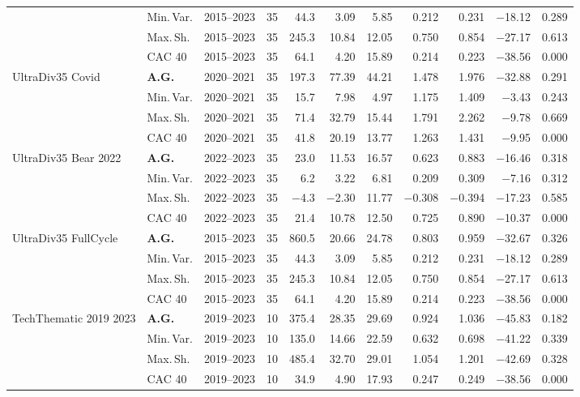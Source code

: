 \begin{longtable}{p{2.6cm} l c c r r r r r r r}
 & Min.\,Var. & 2015--2023 & 35 & 44.3 & 3.09 & 5.85 & 0.212 & 0.231 & $-$18.12 & 0.289 \\
 & Max.\,Sh. & 2015--2023 & 35 & 245.3 & 10.84 & 12.05 & 0.750 & 0.854 & $-$27.17 & 0.613 \\
 & CAC 40 & 2015--2023 & 35 & 64.1 & 4.20 & 15.89 & 0.214 & 0.223 & $-$38.56 & 0.000 \\
\midrule
UltraDiv35 Covid & \textbf{A.G.} & 2020--2021 & 35 & 197.3 & 77.39 & 44.21 & 1.478 & 1.976 & $-$32.88 & 0.291 \\
 & Min.\,Var. & 2020--2021 & 35 & 15.7 & 7.98 & 4.97 & 1.175 & 1.409 & $-$3.43 & 0.243 \\
 & Max.\,Sh. & 2020--2021 & 35 & 71.4 & 32.79 & 15.44 & 1.791 & 2.262 & $-$9.78 & 0.669 \\
 & CAC 40 & 2020--2021 & 35 & 41.8 & 20.19 & 13.77 & 1.263 & 1.431 & $-$9.95 & 0.000 \\
\midrule
UltraDiv35 Bear 2022 & \textbf{A.G.} & 2022--2023 & 35 & 23.0 & 11.53 & 16.57 & 0.623 & 0.883 & $-$16.46 & 0.318 \\
 & Min.\,Var. & 2022--2023 & 35 & 6.2 & 3.22 & 6.81 & 0.209 & 0.309 & $-$7.16 & 0.312 \\
 & Max.\,Sh. & 2022--2023 & 35 & $-$4.3 & $-$2.30 & 11.77 & $-$0.308 & $-$0.394 & $-$17.23 & 0.585 \\
 & CAC 40 & 2022--2023 & 35 & 21.4 & 10.78 & 12.50 & 0.725 & 0.890 & $-$10.37 & 0.000 \\
\midrule
UltraDiv35 FullCycle & \textbf{A.G.} & 2015--2023 & 35 & 860.5 & 20.66 & 24.78 & 0.803 & 0.959 & $-$32.67 & 0.326 \\
 & Min.\,Var. & 2015--2023 & 35 & 44.3 & 3.09 & 5.85 & 0.212 & 0.231 & $-$18.12 & 0.289 \\
 & Max.\,Sh. & 2015--2023 & 35 & 245.3 & 10.84 & 12.05 & 0.750 & 0.854 & $-$27.17 & 0.613 \\
 & CAC 40 & 2015--2023 & 35 & 64.1 & 4.20 & 15.89 & 0.214 & 0.223 & $-$38.56 & 0.000 \\
\midrule
TechThematic 2019 2023 & \textbf{A.G.} & 2019--2023 & 10 & 375.4 & 28.35 & 29.69 & 0.924 & 1.036 & $-$45.83 & 0.182 \\
 & Min.\,Var. & 2019--2023 & 10 & 135.0 & 14.66 & 22.59 & 0.632 & 0.698 & $-$41.22 & 0.339 \\
 & Max.\,Sh. & 2019--2023 & 10 & 485.4 & 32.70 & 29.01 & 1.054 & 1.201 & $-$42.69 & 0.328 \\
 & CAC 40 & 2019--2023 & 10 & 34.9 & 4.90 & 17.93 & 0.247 & 0.249 & $-$38.56 & 0.000 \\

\end{longtable}
